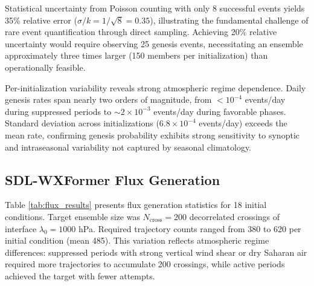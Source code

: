 \documentclass[11pt]{article}
\begin{document}
Statistical uncertainty from Poisson counting with only 8 successful events yields 35\% relative error ($\sigma/k = 1/\sqrt{8} = 0.35$), illustrating the fundamental challenge of rare event quantification through direct sampling. Achieving 20\% relative uncertainty would require observing 25 genesis events, necessitating an ensemble approximately three times larger (150 members per initialization) than operationally feasible.

Per-initialization variability reveals strong atmospheric regime dependence. Daily genesis rates span nearly two orders of magnitude, from $< 10^{-4}$ events/day during suppressed periods to $\sim 2 \times 10^{-3}$ events/day during favorable phases. Standard deviation across initializations ($6.8 \times 10^{-4}$ events/day) exceeds the mean rate, confirming genesis probability exhibits strong sensitivity to synoptic and intraseasonal variability not captured by seasonal climatology.

\subsection{SDL-WXFormer Flux Generation}

Table \ref{tab:flux_results} presents flux generation statistics for 18 initial conditions. Target ensemble size was $N_{\text{cross}} = 200$ decorrelated crossings of interface $\lambda_0 = 1000$ hPa. Required trajectory counts ranged from 380 to 620 per initial condition (mean 485). This variation reflects atmospheric regime differences: suppressed periods with strong vertical wind shear or dry Saharan air required more trajectories to accumulate 200 crossings, while active periods achieved the target with fewer attempts.
\end{document}
